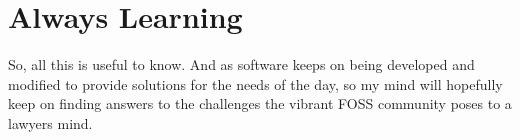 \section*{Always Learning}
So, all this is useful to know. And as software keeps on being developed and modified to provide solutions for the needs of the day, so my mind will hopefully keep on finding answers to the challenges the vibrant FOSS community poses to a lawyers mind.